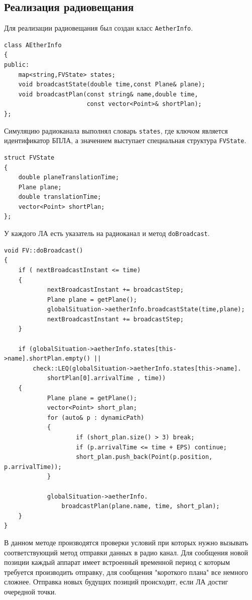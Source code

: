 \documentclass[a4paper,12pt]{article}
\begin{document}
\subsection{Реализация радиовещания}
Для реализации радиовещания был создан класс \texttt{AetherInfo}.
\begin{verbatim}
class AEtherInfo
{
public:
    map<string,FVState> states;
    void broadcastState(double time,const Plane& plane);
    void broadcastPlan(const string& name,double time,
                       const vector<Point>& shortPlan);
};
\end{verbatim}
Симуляцию радиоканала выполнял словарь \texttt{states}, где ключом является идентификатор БПЛА, а значением выступает специальная структура \texttt{FVState}.
\begin{verbatim}
struct FVState
{
    double planeTranslationTime;
    Plane plane;
    double translationTime;
    vector<Point> shortPlan;
};
\end{verbatim}
У каждого ЛА есть указатель на радиоканал и метод \texttt{doBroadcast}.
\begin{verbatim}
void FV::doBroadcast()
{
    if ( nextBroadcastInstant <= time)
    {
            nextBroadcastInstant += broadcastStep;
            Plane plane = getPlane();
            globalSituation->aetherInfo.broadcastState(time,plane);  
            nextBroadcastInstant += broadcastStep;
    }
    
    if (globalSituation->aetherInfo.states[this->name].shortPlan.empty() ||
        check::LEQ(globalSituation->aetherInfo.states[this->name].
            shortPlan[0].arrivalTime , time))
    {
            Plane plane = getPlane();
            vector<Point> short_plan;
            for (auto& p : dynamicPath)
            {
                    if (short_plan.size() > 3) break;
                    if (p.arrivalTime <= time + EPS) continue;
                    short_plan.push_back(Point(p.position, p.arrivalTime));
            }
        
            globalSituation->aetherInfo.
                broadcastPlan(plane.name, time, short_plan);
    }
}
\end{verbatim}
В данном методе производятся проверки условий при которых нужно вызывать соответствующий метод отправки данных в радио канал. Для сообщения новой позиции каждый аппарат имеет встроенный временной период с которым требуется производить отправку, для сообщения "короткого плана" все немного сложнее. Отправка новых будущих позиций происходит, если ЛА достиг очередной точки.
\end{document}
